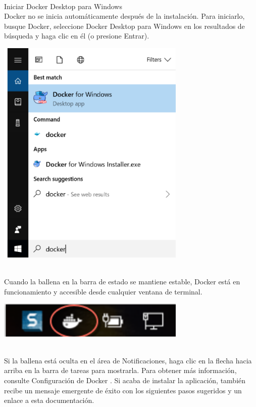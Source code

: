 \documentclass[twoside,onecolumn]{article}
\begin{document}
\begin{flushright}
\begin{itemize}
\textbf{}\\
Iniciar Docker Desktop para Windows
\textbf{}\\
Docker no se inicia automáticamente después de la instalación. Para iniciarlo, busque Docker, seleccione Docker Desktop para Windows en los resultados de búsqueda y haga clic en él (o presione Entrar).
\textbf{}\\
\begin{center}
		\includegraphics[width=9cm]{./Imagenes/n1.png}
\end{center}	
\textbf{}\\
Cuando la ballena en la barra de estado se mantiene estable, Docker está en funcionamiento y accesible desde cualquier ventana de terminal.
\begin{center}
		\includegraphics[width=9cm]{./Imagenes/n2.png}
\end{center}	
\textbf{}\\
Si la ballena está oculta en el área de Notificaciones, haga clic en la flecha hacia arriba en la barra de tareas para mostrarla. Para obtener más información, consulte Configuración de Docker .
Si acaba de instalar la aplicación, también recibe un mensaje emergente de éxito con los siguientes pasos sugeridos y un enlace a esta documentación.
\textbf{}\\
\begin{center}

\end{center}
\end{itemize}
\end{flushright}
\end{document}
